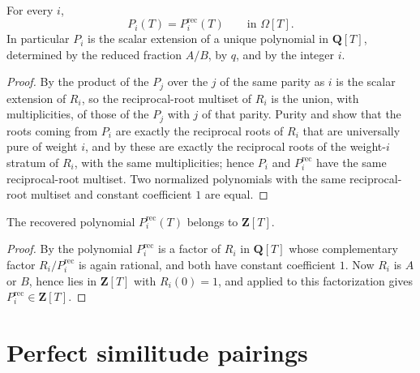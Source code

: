 \begin{proposition}
\label{prop:zla-unique-recovery}
\leanok
For every $i$,
\[
  P_i(T)=P_i^{\mathrm{rec}}(T)
  \qquad\text{in }\Omega[T].
\]
In particular $P_i$ is the scalar extension of a unique polynomial in
$\mathbf Q[T]$, determined by the reduced fraction $A/B$, by $q$, and by the
integer $i$.
\end{proposition}
\begin{proof}
\leanok
By  the product of the $P_j$ over the
$j$ of the same parity as $i$ is the scalar extension of $R_i$, so the
reciprocal-root multiset of $R_i$ is the union, with multiplicities, of those
of the $P_j$ with $j$ of that parity.  Purity and  show that the roots coming
from $P_i$ are exactly the reciprocal roots of $R_i$ that are universally pure
of weight $i$, and by  these are
exactly the reciprocal roots of the weight-$i$ stratum of $R_i$, with the same
multiplicities; hence $P_i$ and $P_i^{\mathrm{rec}}$ have the same
reciprocal-root multiset.  Two normalized polynomials with the same
reciprocal-root multiset and constant coefficient $1$ are equal.
\end{proof}

\begin{proposition}
\label{prop:zla-factor-integrality}
\leanok
The recovered polynomial $P_i^{\mathrm{rec}}(T)$ belongs to $\mathbf Z[T]$.
\end{proposition}
\begin{proof}
\leanok
By  the polynomial
$P_i^{\mathrm{rec}}$ is a factor of $R_i$ in $\mathbf Q[T]$ whose
complementary factor $R_i/P_i^{\mathrm{rec}}$ is again rational, and both
have constant coefficient $1$.  Now $R_i$ is $A$ or $B$, hence lies in
$\mathbf Z[T]$ with $R_i(0)=1$, and  applied to
this factorization gives $P_i^{\mathrm{rec}}\in\mathbf Z[T]$.
\end{proof}

\section{Perfect similitude pairings}\label{sec:zla-similitude}

